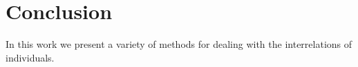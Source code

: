 \chapter{Conclusion}

    In this work we present a variety of methods for dealing with the interrelations of individuals.  